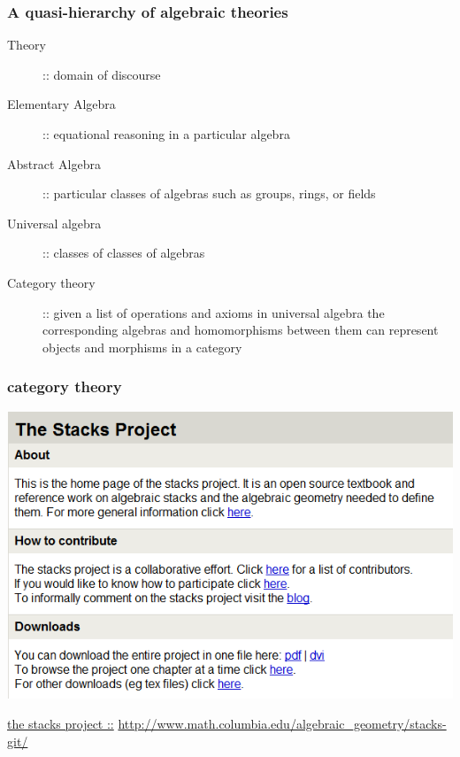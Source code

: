\begin{frame}
\begin{center}
	\begin{restofframe}
		
	\end{restofframe}
\end{center}
\end{frame}

\begin{frame}
\frametitle{A quasi-hierarchy of algebraic theories}
	\begin{description}
		\item[Theory] :: domain of discourse
		\item[Elementary Algebra] :: equational reasoning in a particular algebra
		\item[Abstract Algebra] :: particular classes of algebras such as groups, rings, or fields
		\item[Universal algebra] :: classes of classes of algebras
		\item[Category theory] :: given a list of operations and axioms in universal algebra the corresponding algebras and homomorphisms between them can represent objects and morphisms in a category
	\end{description}
\end{frame}

\begin{frame}
\frametitle{category theory}
	\begin{center}
		\includegraphics[scale=0.4]{fig/stacksproject.png}
	\end{center}
	\href{http://www.math.columbia.edu/algebraic_geometry/stacks-git/}{the stacks project ::}
	\url{http://www.math.columbia.edu/algebraic_geometry/stacks-git/}
\end{frame}

